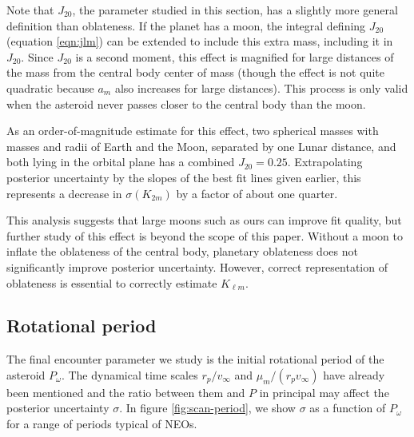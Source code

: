 \documentclass[fleqn,usenatbib]{mnras}
\begin{document}
Note that $J_{20}$, the parameter studied in this section, has a slightly more general definition than oblateness. If the planet has a moon, the integral defining $J_{20}$ (equation \ref{eqn:jlm}) can be extended to include this extra mass, including it in $J_{20}$. Since $J_{20}$ is a second moment, this effect is magnified for large distances of the mass from the central body center of mass (though the effect is not quite quadratic because $a_m$ also increases for large distances). This process is only valid when the asteroid never passes closer to the central body than the moon.

As an order-of-magnitude estimate for this effect, two spherical masses with masses and radii of Earth and the Moon, separated by one Lunar distance, and both lying in the orbital plane has a combined $J_{20} = 0.25$. Extrapolating posterior uncertainty by the slopes of the best fit lines given earlier, this represents a decrease in $\sigma(K_{2m})$ by a factor of about one quarter.

This analysis suggests that large moons such as ours can improve fit quality, but further study of this effect is beyond the scope of this paper. Without a moon to inflate the oblateness of the central body, planetary oblateness does not significantly improve posterior uncertainty. However, correct representation of oblateness is essential to correctly estimate $K_{\ell m}$.



\subsection{Rotational period}
\label{sec:scan-period}

The final encounter parameter we study is the initial rotational period of the asteroid $P_\omega$. The dynamical time scales $r_p/v_\infty$ and $\mu_m / (r_p v_\infty)$ have already been mentioned and the ratio between them and $P$ in principal may affect the posterior uncertainty $\sigma$. In figure \ref{fig:scan-period}, we show $\sigma$ as a function of $P_\omega$ for a range of periods typical of NEOs.
\end{document}
